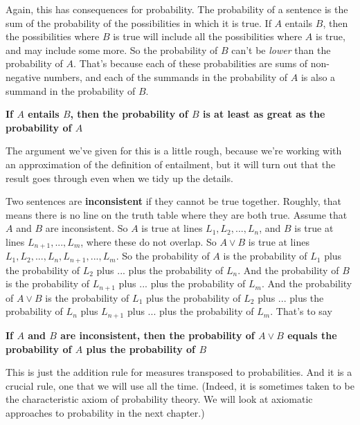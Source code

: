 Again, this has consequences for probability. The probability of a sentence is the sum of the probability of the possibilities in which it is true. If $A$ entails $B$, then the possibilities where $B$ is true will include all the possibilities where $A$ is true, and may include some more. So the probability of $B$ can't be \textit{lower} than the probability of $A$. That's because each of these probabilities are sums of non-negative numbers, and each of the summands in the probability of $A$ is also a summand in the probability of $B$.

\begin{itemize*}
\item \textbf{If $A$ entails $B$, then the probability of $B$ is at least as great as the probability of $A$}
\end{itemize*}

The argument we've given for this is a little rough, because we're working with an approximation of the definition of entailment, but it will turn out that the result goes through even when we tidy up the details.

Two sentences are \textbf{inconsistent} if they cannot be true together. Roughly, that means there is no line on the truth table where they are both true. Assume that $A$ and $B$ are inconsistent. So $A$ is true at lines $L_1, L_2, ..., L_n$, and $B$ is true at lines $L_{n+1}, ..., L_m$, where these do not overlap. So $A \vee B$ is true at lines $L_1, L_2, ..., L_n, L_{n+1}, ..., L_m$. So the probability of $A$ is the probability of $L_1$ plus the probability of $L_2$ plus $...$ plus the probability of $L_n$. And the probability of $B$ is the probability of $L_{n+1}$ plus  $...$ plus the probability of $L_m$. And the probability of $A \vee B$ is the probability of $L_1$ plus the probability of $L_2$ plus $...$ plus the probability of $L_n$ plus $L_{n+1}$ plus  $...$ plus the probability of $L_m$. That's to say

\begin{itemize*}
\item \textbf{If $A$ and $B$ are inconsistent, then the probability of $A \vee B$ equals the probability of $A$ plus the probability of $B$}
\end{itemize*}

This is just the addition rule for measures transposed to probabilities. And it is a crucial rule, one that we will use all the time. (Indeed, it is sometimes taken to be the characteristic axiom of probability theory. We will look at axiomatic approaches to probability in the next chapter.)

